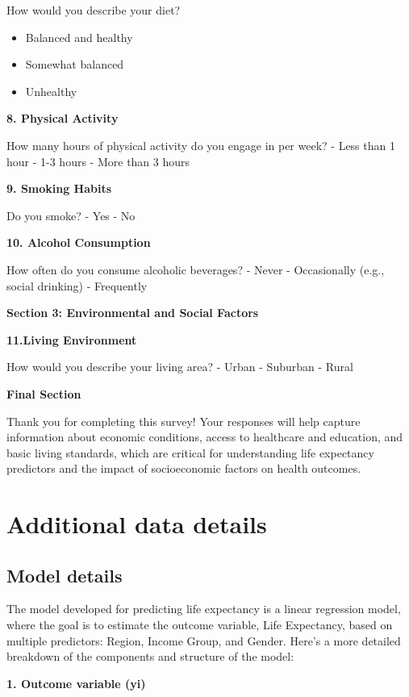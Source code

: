 \documentclass[
  letterpaper,
  DIV=11,
  numbers=noendperiod]{scrartcl}
\providecommand{\tightlist}{%
  \setlength{\itemsep}{0pt}\setlength{\parskip}{0pt}}\usepackage{longtable,booktabs,array}
\begin{document}
How would you describe your diet?

\begin{itemize}
\tightlist
\item
  Balanced and healthy
\item
  Somewhat balanced
\item
  Unhealthy
\end{itemize}

\textbf{8. Physical Activity}

How many hours of physical activity do you engage in per week? - Less
than 1 hour - 1-3 hours - More than 3 hours

\textbf{9. Smoking Habits}

Do you smoke? - Yes - No

\textbf{10. Alcohol Consumption}

How often do you consume alcoholic beverages? - Never - Occasionally
(e.g., social drinking) - Frequently

\textbf{Section 3: Environmental and Social Factors}

\textbf{11.Living Environment}

How would you describe your living area? - Urban - Suburban - Rural

\textbf{Final Section}

Thank you for completing this survey! Your responses will help capture
information about economic conditions, access to healthcare and
education, and basic living standards, which are critical for
understanding life expectancy predictors and the impact of socioeconomic
factors on health outcomes.

\section{Additional data details}\label{additional-data-details}

\subsection{Model details}\label{sec-model-details}

The model developed for predicting life expectancy is a linear
regression model, where the goal is to estimate the outcome variable,
Life Expectancy, based on multiple predictors: Region, Income Group, and
Gender. Here's a more detailed breakdown of the components and structure
of the model:

\textbf{1. Outcome variable (yi)}
\end{document}
